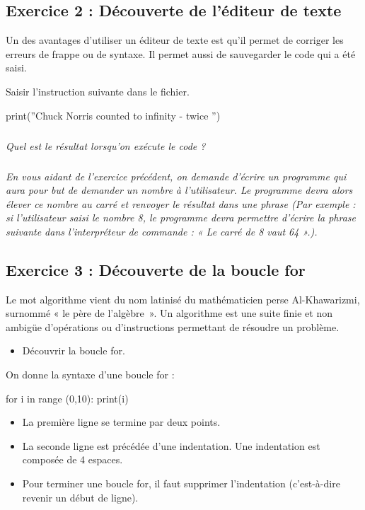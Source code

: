 \documentclass[10pt]{article}
\begin{document}
\subsection*{Exercice 2 : Découverte de l'éditeur de texte}
\setcounter{subparagraph}{0}
Un des avantages d’utiliser un éditeur de texte est qu’il permet de corriger les erreurs de frappe ou de syntaxe. Il permet aussi de sauvegarder le code qui a été saisi. 


\begin{py}
Saisir l'instruction suivante dans le fichier.
\begin{python}
print(''Chuck Norris counted to infinity - twice '')
\end{python}
\end{py}

\subparagraph{}
\textit{Quel est le résultat lorsqu’on exécute le code ?}

\subparagraph{}
\textit{En vous aidant de l’exercice précédent, on demande d’écrire un programme qui aura pour but de demander un nombre à l’utilisateur. Le programme devra alors élever ce nombre au carré et renvoyer le résultat dans une phrase (Par exemple : si l’utilisateur saisi le nombre 8, le programme devra permettre d’écrire la phrase suivante dans l’interpréteur de commande : « Le carré de 8 vaut 64 ».).}


\subsection*{Exercice 3 : Découverte de la boucle for}
\setcounter{subparagraph}{0}

\begin{defi}
Le mot algorithme vient du nom latinisé du mathématicien perse Al-Khawarizmi, surnommé « le père de l’algèbre~». Un algorithme est une suite finie et non ambigüe d’opérations ou d’instructions permettant de résoudre un problème.
\end{defi}

\begin{obj}
\begin{itemize}
\item Découvrir la boucle \textsf{for}.
\end{itemize}
\end{obj}

On donne la syntaxe d'une boucle \textsf{for} :

\begin{py}
\begin{python}
for i in range (0,10):
    print(i)
\end{python}
\end{py}
\begin{rem}
\begin{itemize}
\item La première ligne se termine par deux points.
\item La seconde ligne est précédée d’une indentation. Une indentation est composée de 4 espaces. 
\item Pour terminer une boucle \textsf{for}, il faut supprimer l’indentation (c'est-à-dire revenir un début de ligne). 
\end{itemize}
\end{rem}
\end{document}
